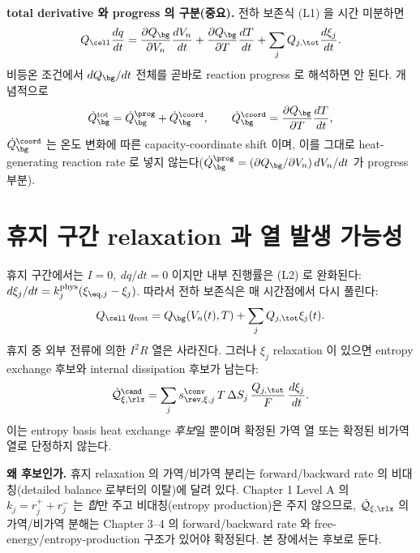 \textbf{total derivative 와 progress 의 구분(중요).} 전하 보존식 (L1) 을 시간 미분하면
\begin{equation}
Q_\cell\frac{dq}{dt}=\frac{\partial Q_\bg}{\partial V_n}\frac{dV_n}{dt}+\frac{\partial Q_\bg}{\partial T}\frac{dT}{dt}
+\sum_jQ_{j,\tot}\frac{d\xi_j}{dt}.
\label{eq:ch2_dQdt}
\end{equation}
비등온 조건에서 $dQ_\bg/dt$ 전체를 곧바로 reaction progress 로 해석하면 안 된다. 개념적으로
\begin{equation}
\dot Q_\bg^{\mathrm{tot}}=\dot Q_\bg^{\prog}+\dot Q_\bg^{\coord},\qquad
\dot Q_\bg^{\coord}=\frac{\partial Q_\bg}{\partial T}\frac{dT}{dt},
\label{eq:ch2_bgsplit}
\end{equation}
$\dot Q_\bg^{\coord}$ 는 온도 변화에 따른 capacity-coordinate shift 이며, 이를 그대로 heat-generating
reaction rate 로 넣지 않는다($\dot Q_\bg^{\prog}=(\partial Q_\bg/\partial V_n)\,dV_n/dt$ 가 progress 부분).

\section{휴지 구간 relaxation 과 열 발생 가능성}\label{sec:ch2_rest}
휴지 구간에서는 $I=0,\ dq/dt=0$ 이지만 내부 진행률은 (L2) 로 완화된다:
$d\xi_j/dt=k_j^{\mathrm{phys}}(\xi_{\eq,j}-\xi_j)$. 따라서 전하 보존식은 매 시간점에서 다시 풀린다:
\begin{equation}
Q_\cell\,q_{\mathrm{rest}}=Q_\bg(V_n(t),T)+\sum_jQ_{j,\tot}\xi_j(t).
\label{eq:ch2_rest_balance}
\end{equation}
휴지 중 외부 전류에 의한 $I^2R$ 열은 사라진다. 그러나 $\xi_j$ relaxation 이 있으면 entropy exchange 후보와
internal dissipation 후보가 남는다:
\begin{equation}
\dot{\mathcal Q}_{\xi,\rlx}^{\cand}=\sum_js_{\rev,\xi,j}^{\conv}\,T\,\Delta S_j\,\frac{Q_{j,\tot}}{F}\,\frac{d\xi_j}{dt}.
\label{eq:ch2_relax}
\end{equation}
이는 entropy basis heat exchange \emph{후보}일 뿐이며 확정된 가역 열 또는 확정된 비가역 열로 단정하지 않는다.
\begin{flagbox}
\textbf{왜 후보인가.} 휴지 relaxation 의 가역/비가역 분리는 forward/backward rate 의 비대칭(detailed balance
로부터의 이탈)에 달려 있다. Chapter 1 Level A 의 $k_j=r_j^++r_j^-$ 는 \emph{합}만 주고 비대칭(entropy
production)은 주지 않으므로, $\dot{\mathcal Q}_{\xi,\rlx}$ 의 가역/비가역 분해는 Chapter 3--4 의
forward/backward rate 와 free-energy/entropy-production 구조가 있어야 확정된다. 본 장에서는 후보로 둔다.
\end{flagbox}

